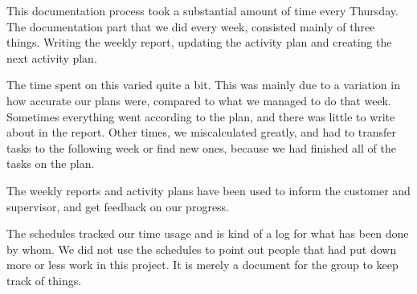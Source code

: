     This documentation process took a substantial amount of time every Thursday. The documentation part that we did every week, consisted mainly of three things. Writing the weekly report, updating the activity plan and creating the next activity plan. 
    
    The time spent on this varied quite a bit. This was mainly due to a variation in how accurate our plans were, compared to what we managed to do that week. Sometimes everything went according to the plan, and there was little to write about in the report. Other times, we miscalculated greatly, and had to transfer tasks to the following week or find new ones, because we had finished all of the tasks on the plan.
    
    The weekly reports and activity plans have been used to inform the customer and supervisor, and get feedback on our progress.
    
    The schedules tracked our time usage and is kind of a log for what has been done by whom. We did not use the schedules to point out people that had put down more or less work in this project. It is merely a document for the group to keep track of things. 
    
    
